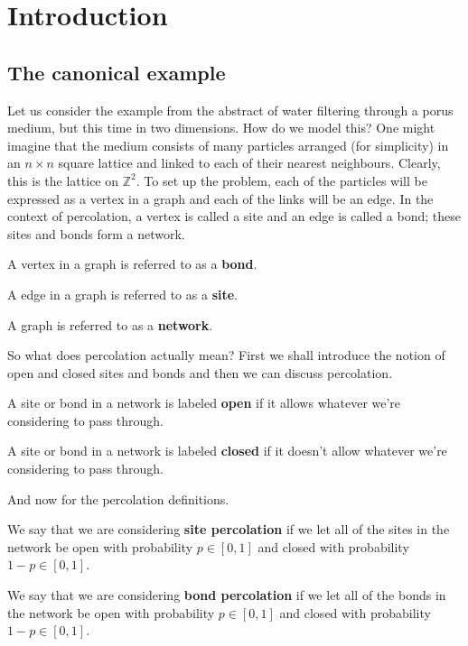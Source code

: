 \section{Introduction}
\subsection{The canonical example}
Let us consider the example from the abstract of water filtering through a porus medium, but this time in two dimensions. How do we model this? One might imagine that the medium consists of
many particles arranged (for simplicity) in an $n \times n$ square lattice and linked to each of their nearest neighbours. Clearly, this is the lattice on $\mathbb{Z}^2$.
To set up the problem, each of the particles will be expressed as a vertex in a graph and each of the links will be an edge. In the context of percolation, a vertex is called a site and an edge is
called a bond; these sites and bonds form a network.

\begin{definition}\label{def:bond}
  A vertex in a graph is referred to as a \textbf{bond}.
\end{definition}

\begin{definition}\label{def:site}
  A edge in a graph is referred to as a \textbf{site}.
\end{definition}

\begin{definition}\label{def:network}
  A graph is referred to as a \textbf{network}.
\end{definition}


So what does percolation actually mean? First we shall introduce the notion of open and closed sites and bonds and then we can discuss percolation.

\begin{definition}\label{def:open}
  A site or bond in a network is labeled \textbf{open} if it allows whatever we're considering to pass through.
\end{definition}

\begin{definition}\label{def:closed}
  A site or bond in a network is labeled \textbf{closed} if it doesn't allow whatever we're considering to pass through.
\end{definition}

And now for the percolation definitions.

\begin{definition}\label{def:sitepercolation}
  We say that we are considering \textbf{site percolation} if we let all of the sites in the network be open with probability $p \in [0, 1]$ and closed with probability $1-p \in [0, 1]$.
\end{definition}
\begin{definition}\label{def:bondpercolation}
  We say that we are considering \textbf{bond percolation} if we let all of the bonds in the network be open with probability $p \in [0, 1]$ and closed with probability $1-p \in [0, 1]$.
\end{definition}


